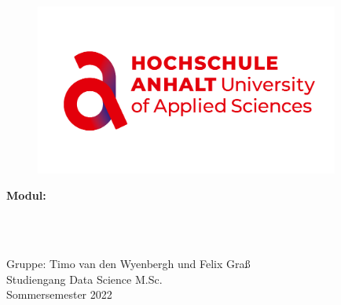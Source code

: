 \begin{titlepage}


\begin{figure}[h]
\begin{center}
\includegraphics[width=10cm]{../../data/HSA_Logo}
\end{center}\label{fig:hsa_logo_figure}
\end{figure}

\begin{center}

\vspace{3.5 cm}


{\Huge \textbf{\Heading}}

\vspace{1.3 cm}

{\Huge \textbf{Modul: \Modul}}\\

\vspace{3 cm}

\begin{onehalfspace}


\begin{large}

\Semester \\


\Dozent \\


\vfill




Gruppe: Timo van den Wyenbergh und Felix Graß\\

Studiengang Data Science M.Sc.\\

Sommersemester 2022\\


\end{large}
\end{onehalfspace}

\end{center}


\end{titlepage}

\newpage %


\tableofcontents %

\thispagestyle{empty}

\newpage %
\setcounter{page}{1} %